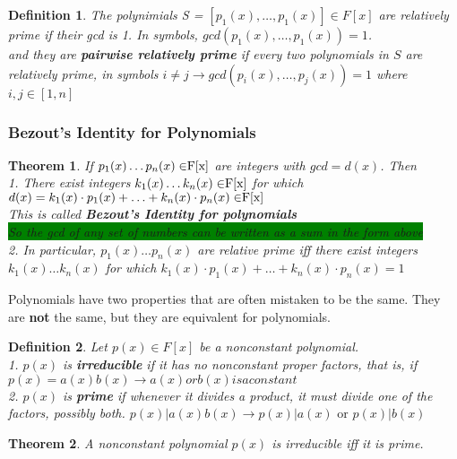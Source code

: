 \documentclass[12pt]{article}
\let\to=\rightarrow
\newcommand{\mybox}[2][black]{\colorbox{#1}{#2}}
\newtheorem{theorem}{Theorem}
\newtheorem{definition}{Definition}
\begin{document}
\begin{definition}
The polynimials S = $[p_{1}(x), \ldots , p_{1}(x)] \in F[x]$ are relatively prime if their gcd is 1. In symbols,
$gcd(p_{1}(x), \ldots , p_{1}(x)) = 1$.\\
and they are \textbf{pairwise relatively prime} if every two polynomials in $S$ are relatively prime, in symbols
$i \neq j \to gcd(p_{i}(x), \ldots , p_{j}(x))= 1$ where $i,j \in [1,n]$
\end{definition}

\subsubsection{Bezout's Identity for Polynomials}
\begin{theorem}
If \(p_{1}(x) \ldots p_{n}(x) \in $F[x]$\) are integers with $gcd = d(x)$. Then\\
1. There exist integers \(k_{1}(x) \ldots k_{n}(x) \in $F[x]$\) for which \\
\(d(x) =k_{1}(x) \cdot p_{1}(x) +  \ldots + k_{n}(x) \cdot p_{n}(x) \in $F[x]$\)\\
This is called \textbf{Bezout's Identity for polynomials}\\
\mybox[green]{So the gcd of any set of numbers can be written as a sum in the form above}\\
2. In particular, \(p_{1}(x) \ldots p_{n}(x)\) are relative prime iff there exist integers \(k_{1}(x) \ldots k_{n}(x)\) for which 
\(k_{1}(x) \cdot p_{1}(x) +  \ldots + k_{n}(x) \cdot p_{n}(x) = 1\) \\
\end{theorem}

Polynomials have two properties that are often mistaken to be the same. They are \textbf{not} the same, but they are equivalent for polynomials.
\begin{definition}
Let $p(x) \in F[x]$ be a nonconstant polynomial.\\
1. $p(x)$ is \textbf{irreducible} if it has no nonconstant proper factors, that is, if \\
\(p(x) = a(x)b(x) \to a(x) or b(x) is a constant\)\\

2. $p(x)$ is \textbf{prime} if whenever it divides a product, it must divide one of the factors, possibly both.
\(p(x)|a(x)b(x) \to p(x)|a(x) \text{ or } p(x)|b(x)\)
\end{definition}


\begin{theorem}
A nonconstant polynomial $p(x)$ is irreducible iff it is prime.
\end{theorem}
\end{document}
